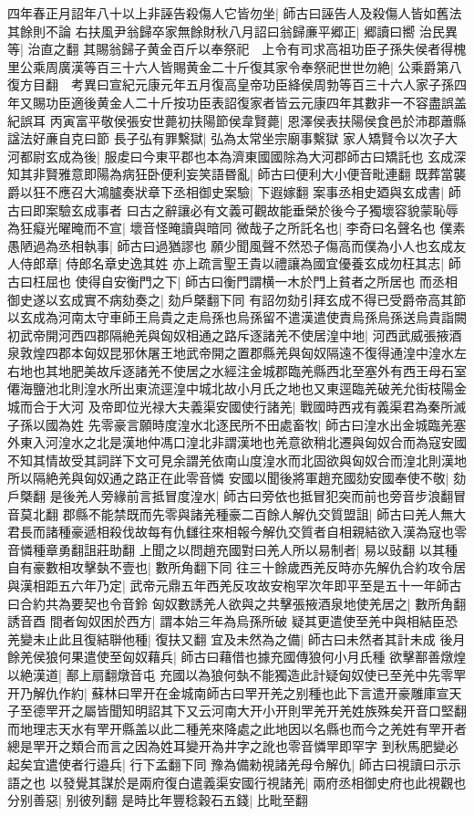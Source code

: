 四年春正月詔年八十以上非誣告殺傷人它皆勿坐|{
	師古曰誣告人及殺傷人皆如舊法其餘則不論}
右扶風尹翁歸卒家無餘財秋八月詔曰翁歸亷平郷正|{
	郷讀曰嚮}
治民異等|{
	治直之翻}
其賜翁歸子黄金百斤以奉祭祀　上令有司求高祖功臣子孫失侯者得槐里公乘周廣漢等百三十六人皆賜黄金二十斤復其家令奉祭祀世世勿絶|{
	公乘爵第八復方目翻　考異曰宣紀元康元年五月復高皇帝功臣絳侯周勃等百三十六人家子孫四年又賜功臣適後黄金人二十斤按功臣表詔復家者皆云元康四年其數非一不容盡誤盖紀誤耳}
丙寅富平敬侯張安世薨初扶陽節侯韋賢薨|{
	恩澤侯表扶陽侯食邑於沛郡蕭縣諡法好亷自克曰節}
長子弘有罪繫獄|{
	弘為太常坐宗廟事繫獄}
家人矯賢令以次子大河都尉玄成為後|{
	服䖍曰今東平郡也本為濟東國國除為大河郡師古曰矯託也}
玄成深知其非賢雅意即陽為病狂卧便利妄笑語昬亂|{
	師古曰便利大小便音毗連翻}
既葬當襲爵以狂不應召大鴻臚奏狀章下丞相御史案驗|{
	下遐嫁翻}
案事丞相史廼與玄成書|{
	師古曰即案驗玄成事者}
曰古之辭讓必有文義可觀故能垂榮於後今子獨壞容貌蒙恥辱為狂癡光曜晻而不宣|{
	壞音怪晻讀與暗同}
微哉子之所託名也|{
	李奇曰名聲名也}
僕素愚陋過為丞相執事|{
	師古曰過猶謬也}
願少聞風聲不然恐子傷高而僕為小人也玄成友人侍郎章|{
	侍郎名章史逸其姓}
亦上疏言聖王貴以禮讓為國宜優養玄成勿枉其志|{
	師古曰枉屈也}
使得自安衡門之下|{
	師古曰衡門謂横一木於門上貧者之所居也}
而丞相御史遂以玄成實不病劾奏之|{
	劾戶槩翻下同}
有詔勿劾引拜玄成不得已受爵帝高其節以玄成為河南太守車師王烏貴之走烏孫也烏孫留不遣漢遣使責烏孫烏孫送烏貴詣闕　初武帝開河西四郡隔絶羌與匈奴相通之路斥逐諸羌不使居湟中地|{
	河西武威張掖酒泉敦煌四郡本匈奴昆邪休屠王地武帝開之置郡縣羌與匈奴隔遠不復得通湟中湟水左右地也其地肥美故斥逐諸羌不使居之水經注金城郡臨羌縣西北至塞外有西王母石室僊海鹽池北則湟水所出東流逕湟中城北故小月氏之地也又東逕臨羌破羌允街枝陽金城而合于大河}
及帝即位光禄大夫義渠安國使行諸羌|{
	戰國時西戎有義渠君為秦所滅子孫以國為姓}
先零豪言願時度湟水北逐民所不田處畜牧|{
	師古曰湟水出金城臨羌塞外東入河湟水之北是漢地仲馮口湟北非謂漢地也羌意欲稍北遷與匈奴合而為寇安國不知其情故受其詞詳下文可見余謂羌依南山度湟水而北固欲與匈奴合而湟北則漢地所以隔絶羌與匈奴通之路正在此零音憐}
安國以聞後將軍趙充國劾安國奉使不敬|{
	劾戶槩翻}
是後羌人旁緣前言抵冒度湟水|{
	師古曰旁依也抵冒犯突而前也旁音步浪翻冒音莫北翻}
郡縣不能禁既而先零與諸羌種豪二百餘人解仇交質盟詛|{
	師古曰羌人無大君長而諸種豪遞相殺伐故每有仇讎往來相報今解仇交質者自相親結欲入漢為寇也零音憐種章勇翻詛莊助翻}
上聞之以問趙充國對曰羌人所以易制者|{
	易以䜴翻}
以其種自有豪數相攻擊埶不壹也|{
	數所角翻下同}
往三十餘歲西羌反時亦先解仇合約攻令居與漢相距五六年乃定|{
	武帝元鼎五年西羌反攻故安枹罕次年即平至是五十一年師古曰合約共為要契也令音鈴}
匈奴數誘羌人欲與之共擊張掖酒泉地使羌居之|{
	數所角翻誘音酉}
間者匈奴困於西方|{
	謂本始三年為烏孫所破}
疑其更遣使至羌中與相結臣恐羌變未止此且復結聨他種|{
	復扶又翻}
宜及未然為之備|{
	師古曰未然者其計未成}
後月餘羌侯狼何果遣使至匈奴藉兵|{
	師古曰藉借也據充國傳狼何小月氏種}
欲擊鄯善燉煌以絶漢道|{
	鄯上扇翻燉音屯}
充國以為狼何埶不能獨造此計疑匈奴使已至羌中先零䍐开乃解仇作約|{
	蘇林曰䍐开在金城南師古曰䍐开羌之别種也此下言遣开豪雕庫宣天子至德䍐开之屬皆聞知明詔其下又云河南大开小开則䍐羌开羌姓族殊矣开音口堅翻而地理志天水有䍐开縣盖以此二種羌來降處之此地因以名縣也而今之羌姓有䍐开者總是䍐开之類合而言之因為姓耳變开為井字之訛也零音憐䍐即罕字}
到秋馬肥變必起矣宜遣使者行邉兵|{
	行下孟翻下同}
豫為備勑視諸羌母令解仇|{
	師古曰視讀曰示示語之也}
以發覺其謀於是兩府復白遣義渠安國行視諸羌|{
	兩府丞相御史府也此視觀也}
分别善惡|{
	别彼列翻}
是時比年豐稔穀石五錢|{
	比毗至翻}


